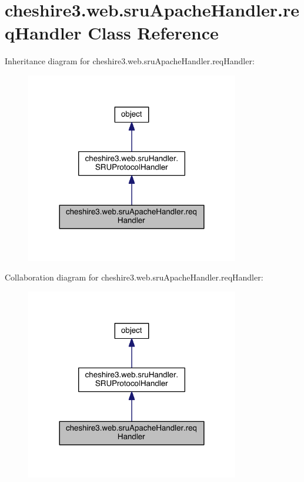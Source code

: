 \hypertarget{classcheshire3_1_1web_1_1sru_apache_handler_1_1req_handler}{\section{cheshire3.\-web.\-sru\-Apache\-Handler.\-req\-Handler Class Reference}
\label{classcheshire3_1_1web_1_1sru_apache_handler_1_1req_handler}
}


Inheritance diagram for cheshire3.\-web.\-sru\-Apache\-Handler.\-req\-Handler\-:
\nopagebreak
\begin{figure}[H]
\begin{center}
\leavevmode
\includegraphics[width=264pt]{classcheshire3_1_1web_1_1sru_apache_handler_1_1req_handler__inherit__graph}
\end{center}
\end{figure}


Collaboration diagram for cheshire3.\-web.\-sru\-Apache\-Handler.\-req\-Handler\-:
\nopagebreak
\begin{figure}[H]
\begin{center}
\leavevmode
\includegraphics[width=264pt]{classcheshire3_1_1web_1_1sru_apache_handler_1_1req_handler__coll__graph}
\end{center}
\end{figure}
